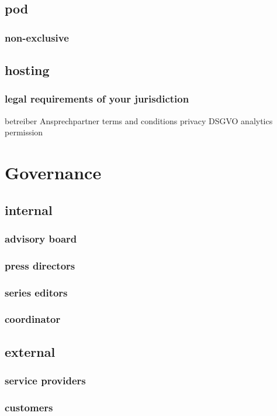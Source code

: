 \documentclass[output=guidelines,guidelines] {langscibook}
\begin{document}
\subsection{pod}
\subsubsection{non-exclusive}
\subsection{hosting}
\subsubsection{legal requirements of your jurisdiction}
                    betreiber
                    Ansprechpartner
                    terms and conditions
                    privacy
                        DSGVO
                        analytics
                        permission
\section{Governance}
\subsection{internal}
\subsubsection{advisory board}
\subsubsection{press directors}
\subsubsection{series editors}
\subsubsection{coordinator}
\subsection{external}
\subsubsection{service providers}
\subsubsection{customers}
\end{document}
